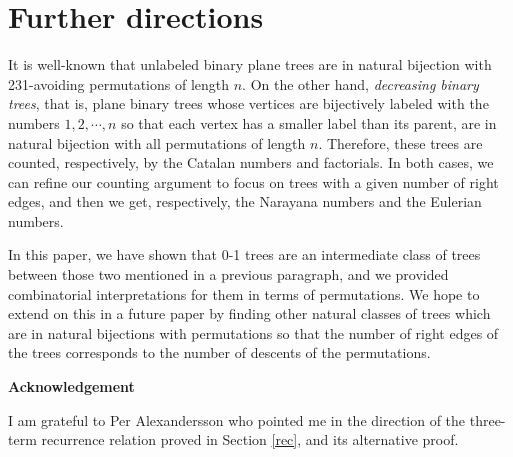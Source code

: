 \documentclass[11pt]{article}
\begin{document}
\section{Further directions} \label{further}
It is well-known that unlabeled binary plane trees are in natural bijection with 231-avoiding permutations of length $n$. On the other hand, {\em decreasing binary trees}, that is, plane binary trees whose vertices are bijectively labeled with the numbers $1,2,\cdots ,n$ so that each vertex has a smaller label than its parent, are in natural bijection with all permutations of length $n$. Therefore, these trees are counted, respectively, by the Catalan numbers and factorials. In both cases, we can refine our counting
argument to focus on trees with a given number of right edges, and then we get, respectively, the Narayana numbers and the Eulerian numbers.  

In this paper, we have shown that 0-1 trees are an intermediate class of trees between those two mentioned in a previous paragraph, and we provided combinatorial 
interpretations for them in terms of permutations. We hope to extend on this in a future paper by finding other natural classes of trees which are in natural bijections
with permutations so that the number of right edges of the trees corresponds to the number of descents of the permutations.


\begin{center} {\bf Acknowledgement}  \end{center}
I am grateful to Per Alexandersson who pointed me in the direction of the three-term recurrence relation proved in Section \ref{rec}, and its alternative proof.
\end{document}
